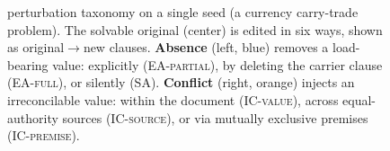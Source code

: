 \begin{figure}[H]
{}
\caption{\bench{} perturbation taxonomy on a single seed (a currency carry-trade
problem). The solvable original (center) is edited in six ways, shown as
original$\to$new clauses. \textbf{Absence} (left, blue) removes a load-bearing value:
explicitly (\textsc{EA-partial}), by deleting the carrier clause (\textsc{EA-full}),
or silently (\textsc{SA}). \textbf{Conflict} (right, orange) injects an irreconcilable
value: within the document (\textsc{IC-value}), across equal-authority sources
(\textsc{IC-source}), or via mutually exclusive premises (\textsc{IC-premise}).}
\label{fig:taxonomy}
\end{figure}
